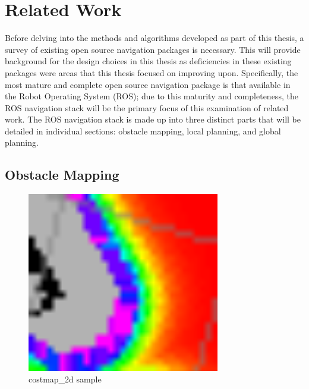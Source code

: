 \section{Related Work}\label{sec:related_work}

Before delving into the methods and algorithms developed as part of this thesis, a survey of existing open source navigation packages is necessary. This will provide background for the design choices in this thesis as deficiencies in these existing packages were areas that this thesis focused on improving upon. Specifically, the most mature and complete open source navigation package is that available in the Robot Operating System (ROS)\autocite{Marder-Eppstein2010}; due to this maturity and completeness, the ROS navigation stack will be the primary focus of this examination of related work. The ROS navigation stack is made up into three distinct parts that will be detailed in individual sections: obstacle mapping, local planning, and global planning.

\subsection{Obstacle Mapping}\label{subsec:costmap_2d}

\begin{figure}
\centering
\includegraphics[width=0.75\textwidth]{images/costmap_2d_costgradient}
\caption{costmap\_2d sample \label{fig:costmap_2d_costgradient}}
\end{figure}

